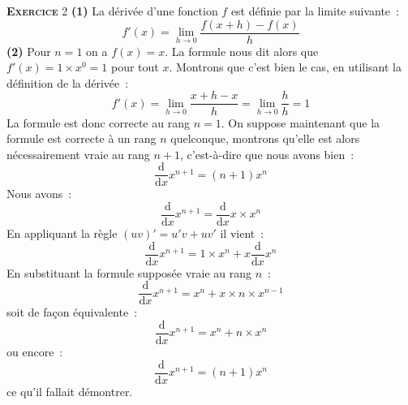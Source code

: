 \documentclass[10pt,a4paper,notitlepage]{article}
\newcommand{\exercice}[1]{\textsc{\textbf{Exercice}} #1}
\begin{document}
\exercice{2} \textbf{(1)} La dérivée d'une fonction $f$ est définie
par la limite suivante :
\[
f'(x) = \lim_{h\rightarrow 0} \frac{f(x+h)-f(x)}{h}
\]
\textbf{(2)} Pour $n=1$ on a $f(x) = x$. La formule nous dit alors que
$f'(x) = 1\times x^0 = 1$ pour tout $x$. Montrons que c'est bien le
cas, en utilisant la définition de la dérivée :
\[
f'(x) = \lim_{h\rightarrow 0} \frac{x+h-x}{h} = \lim_{h\rightarrow 0}
\frac{h}{h} = 1 
\]
La formule est donc correcte au rang $n=1$. On suppose maintenant que
la formule est correcte à un rang $n$ quelconque, montrons qu'elle est
alors nécessairement vraie au rang $n+1$, c'est-à-dire que nous avons
bien :
\[
\frac{\mathrm d}{\mathrm dx}x^{n+1} = (n+1)x^n
\]
Nous avons :
\[
\frac{\mathrm d}{\mathrm dx} x^{n+1} = \frac{\mathrm d}{\mathrm dx} x
\times x^n
\]
En appliquant la règle $(uv)'=u'v+uv'$ il vient :
\[
\frac{\mathrm d}{\mathrm dx} x^{n+1} = 1 \times x^n + x \frac{\mathrm
  d}{\mathrm dx} x^n
\]
En substituant la formule supposée vraie au rang $n$ :
\[
\frac{\mathrm d}{\mathrm dx} x^{n+1} = x^n + x \times n \times x^{n-1}
\]
soit de façon équivalente :
\[
\frac{\mathrm d}{\mathrm dx} x^{n+1} = x^n + n \times x^{n}
\]
ou encore :
\[
\frac{\mathrm d}{\mathrm dx} x^{n+1} = (n+1) x^{n}
\]
ce qu'il fallait démontrer.

\bigskip
\end{document}
